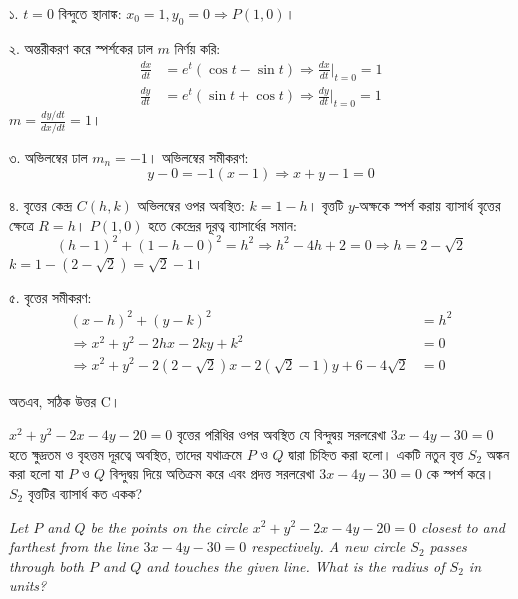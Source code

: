 \documentclass[12pt, a4paper]{article}
\begin{document}
\begin{tcolorbox}[solutionbox={সমাধান (Solution)}]
    \noindent
    ১. $t = 0$ বিন্দুতে স্থানাঙ্ক: $x_0 = 1, y_0 = 0 \Rightarrow P(1, 0)$।
    
    \vspace{0.5em}
    ২. অন্তরীকরণ করে স্পর্শকের ঢাল $m$ নির্ণয় করি:
    \begin{align*}
        \frac{dx}{dt} &= e^t(\cos t - \sin t) \Rightarrow \frac{dx}{dt}\Big|_{t=0} = 1 \\
        \frac{dy}{dt} &= e^t(\sin t + \cos t) \Rightarrow \frac{dy}{dt}\Big|_{t=0} = 1
    \end{align*}
    $m = \frac{dy/dt}{dx/dt} = 1$।
    
    \vspace{0.5em}
    ৩. অভিলম্বের ঢাল $m_n = -1$। অভিলম্বের সমীকরণ: 
    \[ y - 0 = -1(x - 1) \Rightarrow x + y - 1 = 0 \]
    
    \vspace{0.5em}
    ৪. বৃত্তের কেন্দ্র $C(h, k)$ অভিলম্বের ওপর অবস্থিত: $k = 1 - h$। বৃত্তটি $y$-অক্ষকে স্পর্শ করায় ব্যাসার্ধ বৃত্তের ক্ষেত্রে $R = h$। $P(1,0)$ হতে কেন্দ্রের দূরত্ব ব্যাসার্ধের সমান:
    \[ (h - 1)^2 + (1 - h - 0)^2 = h^2 \Rightarrow h^2 - 4h + 2 = 0 \Rightarrow h = 2 - \sqrt{2} \]
    $k = 1 - (2 - \sqrt{2}) = \sqrt{2} - 1$।
    
    \vspace{0.5em}
    ৫. বৃত্তের সমীকরণ: 
    \begin{align*}
        (x - h)^2 + (y - k)^2 &= h^2 \\
        \Rightarrow x^2 + y^2 - 2hx - 2ky + k^2 &= 0 \\
        \Rightarrow x^2 + y^2 - 2(2-\sqrt{2})x - 2(\sqrt{2}-1)y + 6 - 4\sqrt{2} &= 0
    \end{align*}
    
    \vspace{0.5em}
    অতএব, সঠিক উত্তর C।
\end{tcolorbox}
\begin{tcolorbox}[questionbox={প্রশ্ন (Question) 45}]
    \noindent
    $x^2 + y^2 - 2x - 4y - 20 = 0$ বৃত্তের পরিধির ওপর অবস্থিত যে বিন্দুদ্বয় সরলরেখা $3x - 4y - 30 = 0$ হতে ক্ষুদ্রতম ও বৃহত্তম দূরত্বে অবস্থিত, তাদের যথাক্রমে $P$ ও $Q$ দ্বারা চিহ্নিত করা হলো। একটি নতুন বৃত্ত $S_2$ অঙ্কন করা হলো যা $P$ ও $Q$ বিন্দুদ্বয় দিয়ে অতিক্রম করে এবং প্রদত্ত সরলরেখা $3x - 4y - 30 = 0$ কে স্পর্শ করে। $S_2$ বৃত্তটির ব্যাসার্ধ কত একক?
    
    \vspace{0.8em}
    \begin{english}
    \noindent\textit{\color{darkgray}
    Let $P$ and $Q$ be the points on the circle $x^2 + y^2 - 2x - 4y - 20 = 0$ closest to and farthest from the line $3x - 4y - 30 = 0$ respectively. A new circle $S_2$ passes through both $P$ and $Q$ and touches the given line. What is the radius of $S_2$ in units?
    }
    \end{english}
\end{tcolorbox}
\end{document}
